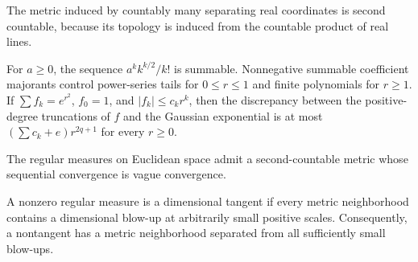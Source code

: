 \begin{lemma}
\label{lem:countable-coordinate-second-countability}

The metric induced by countably many separating real coordinates is second countable, because its topology is induced from the countable product of real lines.
\end{lemma}

\begin{lemma}
\label{lem:scalar-gaussian-series-remainder}

For $a\geq0$, the sequence $a^k k^{k/2}/k!$ is summable. Nonnegative summable coefficient majorants control power-series tails for $0\leq r\leq1$ and finite polynomials for $r\geq1$. If $\sum f_k=e^{r^2}$, $f_0=1$, and $|f_k|\leq c_k r^k$, then the discrepancy between the positive-degree truncations of $f$ and the Gaussian exponential is at most $(\sum c_k+e)r^{2q+1}$ for every $r\geq0$.
\end{lemma}

\begin{lemma}
\label{lem:vague-second-countable}

The regular measures on Euclidean space admit a second-countable metric whose sequential convergence is vague convergence.
\end{lemma}

\begin{lemma}
\label{lem:dimensional-tangent-metric-separation}

A nonzero regular measure is a dimensional tangent if every metric neighborhood contains a dimensional blow-up at arbitrarily small positive scales. Consequently, a nontangent has a metric neighborhood separated from all sufficiently small blow-ups.
\end{lemma}

